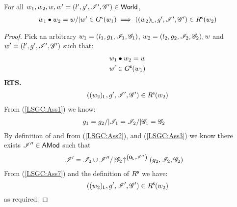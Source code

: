 \begin{lemma}[]\label{lem:shiftGContainment}
%
For all $w_1, w_2, w, w' = (l', g', \mathscr{I}', \mathscr{G}') \in \textsf{World}$, 
\[
\begin{array}{l}
	w_1 \bullet w_2 = w /| w' \in G^{\textsf{s}}(w_1) \implies ((w_2)_{\textsf{L}}, g', \mathscr{I}', \mathscr{G}') \in R^{\textsf{s}}(w_2)
\end{array}
\]
%
\begin{proof} Pick an arbitrary $w_1 = (l_1, g_1, \mathscr{I}_{1}, \mathscr{G}_{1})$, $w_2 = (l_2, g_2, \mathscr{I}_{2}, \mathscr{G}_{2}), w$ and $w' = (l', g', \mathscr{I}', \mathscr{G}')$ such that:
%
\begin{align}
	& w_1 \bullet w_2 = w \label{LSGC:Ass1}\\
	& w' \in G^{\textsf{s}}(w_1) \label{LSGC:Ass2}
\end{align}
%
\textbf{RTS.}
%
\begin{align*}
	((w_2)_{\textsf{L}}, g', \mathscr{I}', \mathscr{G}') \in R^{\textsf{s}}(w_2) 
\end{align*}
%
From (\ref{LSGC:Ass1}) we know:
%
\begin{align}
	& g_1 = g_2 /| \mathscr{I}_{1} = \mathscr{I}_{2} /| \mathscr{G}_{1} = \mathscr{G}_{2} \label{LSGC:Ass3}
\end{align}
%
By definition of \shiftG and from (\ref{LSGC:Ass2}), and (\ref{LSGC:Ass3}) we know there exists $\mathscr{I}'' \in \textsf{AMod}$ such that
%
\begin{align}
%
	& \lmod' = \lmod_{2} \cup \lmod'' /| \expandsAM{\gmod_{2}}{\unitL}{\lmod''}{g_2}{\lmod_{2}}{\gmod_{2}}\label{LSGC:Ass7}
%
\end{align}
%
From (\ref{LSGC:Ass7}) and the definition of $R^{\textsf{s}}$ we have:
%
\begin{equation}
	((w_2)_{\textsf{L}}, g', \mathscr{I}', \mathscr{G}') \in R^{\textsf{s}}(w_2) \nonumber
\end{equation}
% 
as required.
\end{proof}
%
%
\end{lemma}
%
